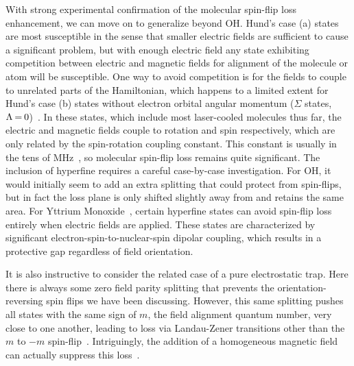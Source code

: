 With strong experimental confirmation of the molecular spin-flip loss enhancement, we can move on to generalize beyond OH.
Hund's case (a) states are most susceptible in the sense that smaller electric fields are sufficient to cause a significant problem, but with enough electric field any state exhibiting competition between electric and magnetic fields for alignment of the molecule or atom will be susceptible.
One way to avoid competition is for the fields to couple to unrelated parts of the Hamiltonian, which happens to a limited extent for Hund's case (b) states without electron orbital angular momentum ($\Sigma$ states, $\Lambda{\nobreak\hspace{.2em}} {=}{\nobreak\hspace{.2em}} 0$)~\cite{Bohn2013}.
In these states, which include most laser-cooled molecules thus far, the electric and magnetic fields couple to rotation and spin respectively, which are only related by the spin-rotation coupling constant.
This constant is usually in the tens of MHz~\cite{Quemener2016}, so molecular spin-flip loss remains quite significant.
The inclusion of hyperfine requires a careful case-by-case investigation. For OH, it would initially seem to add an extra splitting that could protect from spin-flips, but in fact the loss plane is only shifted slightly away from \epb{} and retains the same area.
For Yttrium Monoxide~\cite{Collopy2018}, certain hyperfine states can avoid spin-flip loss entirely when electric fields are applied.
These states are characterized by significant electron-spin-to-nuclear-spin dipolar coupling, which results in a protective gap regardless of field orientation.

It is also instructive to consider the related case of a pure electrostatic trap.
Here there is always some zero field parity splitting that prevents the orientation-reversing spin flips we have been discussing.
However, this same splitting pushes all states with the same sign of $m$, the field alignment quantum number, very close to one another, leading to loss via Landau-Zener transitions other than the $m$ to $-m$ spin-flip~\cite{Wall2010}.
Intriguingly, the addition of a homogeneous magnetic field can actually suppress this loss~\cite{Meek2011}.

